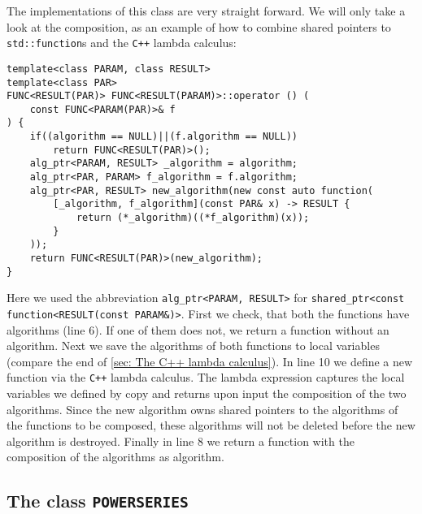 \documentclass{article}
\newcommand{\cc}{\texttt{C++}\xspace}
\newcommand{\code}[1]{\texttt{#1}}
\newcommand{\func}[1]{\texttt{#1}}
\begin{document}
The implementations of this class are very straight forward. We will only take a look at the composition, as an example of how to combine shared pointers to \code{std::function}s and the \cc lambda calculus:
\begin{lstlisting}
template<class PARAM, class RESULT>
template<class PAR>
FUNC<RESULT(PAR)> FUNC<RESULT(PARAM)>::operator () (
	const FUNC<PARAM(PAR)>& f
) {
	if((algorithm == NULL)||(f.algorithm == NULL))
		return FUNC<RESULT(PAR)>();
	alg_ptr<PARAM, RESULT> _algorithm = algorithm;
	alg_ptr<PAR, PARAM> f_algorithm = f.algorithm;
	alg_ptr<PAR, RESULT> new_algorithm(new const auto function(
		[_algorithm, f_algorithm](const PAR& x) -> RESULT {
			return (*_algorithm)((*f_algorithm)(x));
		}
	));
	return FUNC<RESULT(PAR)>(new_algorithm);
}
\end{lstlisting}
Here we used the abbreviation \code{alg\_ptr<PARAM, RESULT>} for \code{shared\_ptr<const function<RESULT(const PARAM\&)>}. First we check, that both the functions have algorithms (line 6). If one of them does not, we return a function without an algorithm. Next we save the algorithms of both functions to local variables (compare the end of \cref{sec: The C++ lambda calculus}). In line 10 we define a new function via the \cc lambda calculus. The lambda expression captures the local variables we defined by copy and returns upon input the composition of the two algorithms. Since the new algorithm owns shared pointers to the algorithms of the functions to be composed, these algorithms will not be deleted before the new algorithm is destroyed. Finally in line 8 we return a function with the composition of the algorithms as algorithm.


\subsection{The class \func{POWERSERIES}}
\end{document}
